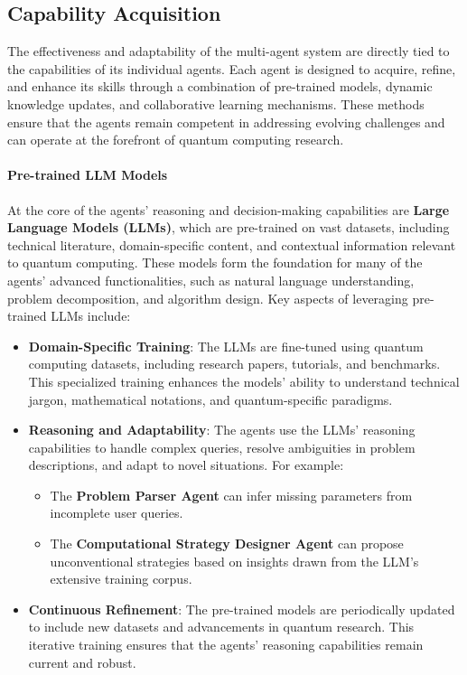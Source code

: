 \documentclass[12pt]{article}
\begin{document}
\subsection{Capability Acquisition}
The effectiveness and adaptability of the multi-agent system are directly tied to the capabilities of its individual agents. Each agent is designed to acquire, refine, and enhance its skills through a combination of pre-trained models, dynamic knowledge updates, and collaborative learning mechanisms. These methods ensure that the agents remain competent in addressing evolving challenges and can operate at the forefront of quantum computing research.

\paragraph{Pre-trained LLM Models}
At the core of the agents' reasoning and decision-making capabilities are \textbf{Large Language Models (LLMs)}, which are pre-trained on vast datasets, including technical literature, domain-specific content, and contextual information relevant to quantum computing. These models form the foundation for many of the agents’ advanced functionalities, such as natural language understanding, problem decomposition, and algorithm design. Key aspects of leveraging pre-trained LLMs include:
\begin{itemize}
    \item \textbf{Domain-Specific Training}: The LLMs are fine-tuned using quantum computing datasets, including research papers, tutorials, and benchmarks. This specialized training enhances the models' ability to understand technical jargon, mathematical notations, and quantum-specific paradigms.
    \item \textbf{Reasoning and Adaptability}: The agents use the LLMs’ reasoning capabilities to handle complex queries, resolve ambiguities in problem descriptions, and adapt to novel situations. For example:
    \begin{itemize}
        \item The \textbf{Problem Parser Agent} can infer missing parameters from incomplete user queries.
        \item The \textbf{Computational Strategy Designer Agent} can propose unconventional strategies based on insights drawn from the LLM’s extensive training corpus.
    \end{itemize}
    \item \textbf{Continuous Refinement}: The pre-trained models are periodically updated to include new datasets and advancements in quantum research. This iterative training ensures that the agents' reasoning capabilities remain current and robust.
\end{itemize}
\end{document}

